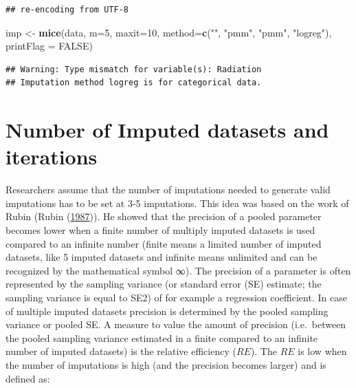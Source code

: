 \documentclass[
]{book}
\newenvironment{Shaded}{\begin{snugshade}}{\end{snugshade}}
\newcommand{\DataTypeTok}[1]{\textcolor[rgb]{0.13,0.29,0.53}{#1}}
\newcommand{\DecValTok}[1]{\textcolor[rgb]{0.00,0.00,0.81}{#1}}
\newcommand{\KeywordTok}[1]{\textcolor[rgb]{0.13,0.29,0.53}{\textbf{#1}}}
\newcommand{\NormalTok}[1]{#1}
\newcommand{\OtherTok}[1]{\textcolor[rgb]{0.56,0.35,0.01}{#1}}
\newcommand{\StringTok}[1]{\textcolor[rgb]{0.31,0.60,0.02}{#1}}
\begin{document}
\begin{verbatim}
## re-encoding from UTF-8
\end{verbatim}

\begin{Shaded}
\begin{Highlighting}[]
\NormalTok{imp <-}\StringTok{ }\KeywordTok{mice}\NormalTok{(data, }\DataTypeTok{m=}\DecValTok{5}\NormalTok{, }\DataTypeTok{maxit=}\DecValTok{10}\NormalTok{, }\DataTypeTok{method=}\KeywordTok{c}\NormalTok{(}\StringTok{""}\NormalTok{, }\StringTok{"pmm"}\NormalTok{, }\StringTok{"pmm"}\NormalTok{, }\StringTok{"logreg"}\NormalTok{), }\DataTypeTok{printFlag =} \OtherTok{FALSE}\NormalTok{)}
\end{Highlighting}
\end{Shaded}

\begin{verbatim}
## Warning: Type mismatch for variable(s): Radiation
## Imputation method logreg is for categorical data.
\end{verbatim}

\hypertarget{number-of-imputed-datasets-and-iterations}{%
\section{Number of Imputed datasets and
iterations}\label{number-of-imputed-datasets-and-iterations}}

Researchers assume that the number of imputations needed to generate
valid imputations has to be set at 3-5 imputations. This idea was based
on the work of Rubin (Rubin (\protect\hyperlink{ref-Rubin1987}{1987})).
He showed that the precision of a pooled parameter becomes lower when a
finite number of multiply imputed datasets is used compared to an
infinite number (finite means a limited number of imputed datasets, like
5 imputed datasets and infinite means unlimited and can be recognized by
the mathematical symbol ∞). The precision of a parameter is often
represented by the sampling variance (or standard error (SE) estimate;
the sampling variance is equal to SE2) of for example a regression
coefficient. In case of multiple imputed datasets precision is
determined by the pooled sampling variance or pooled SE. A measure to
value the amount of precision (i.e.~between the pooled sampling variance
estimated in a finite compared to an infinite number of imputed
datasets) is the relative efficiency (\(RE\)). The \(RE\) is low when
the number of imputations is high (and the precision becomes larger) and
is defined as:
\end{document}
